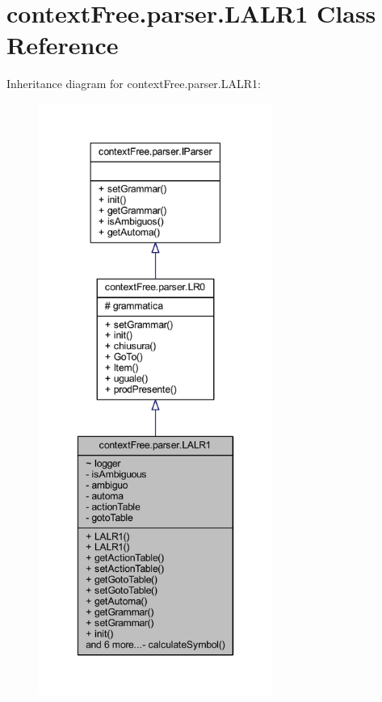 \hypertarget{classcontext_free_1_1parser_1_1_l_a_l_r1}{\section{context\-Free.\-parser.\-L\-A\-L\-R1 Class Reference}
\label{classcontext_free_1_1parser_1_1_l_a_l_r1}
}


Inheritance diagram for context\-Free.\-parser.\-L\-A\-L\-R1\-:\nopagebreak
\begin{figure}[H]
\begin{center}
\leavevmode
\includegraphics[height=550pt]{classcontext_free_1_1parser_1_1_l_a_l_r1__inherit__graph}
\end{center}
\end{figure}


